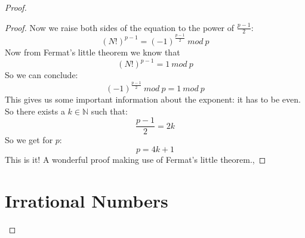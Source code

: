 \documentclass{article}
\theoremstyle{definition}
\begin{document}
\begin{proof}
\begin{proof}
Now we raise both sides of the equation to the power of $\frac{p-1}{2}$:
\begin{equation}
    (N!)^{p-1} = (-1)^{\frac{p-1}{2}} \: mod \: p
\end{equation}
Now from Fermat's little theorem we know that
\begin{equation}
    (N!)^{p-1} = 1 \: mod \: p
\end{equation}
So we can conclude:
\begin{equation}
    (-1)^{\frac{p-1}{2}} \: mod \: p = 1 \: mod \: p
\end{equation}
This gives us some important information about the exponent: it has to be even. So there exists a $k \in \mathbb{N}$ such that:
\begin{equation}
    \frac{p-1}{2} = 2k 
\end{equation}
So we get for $p$:
\begin{equation}
    p = 4k +1 
\end{equation}
This is it! A wonderful proof making use of Fermat's little theorem.,
\end{proof}


\newpage

























\section{Irrational Numbers}

\end{proof}
\end{document}
